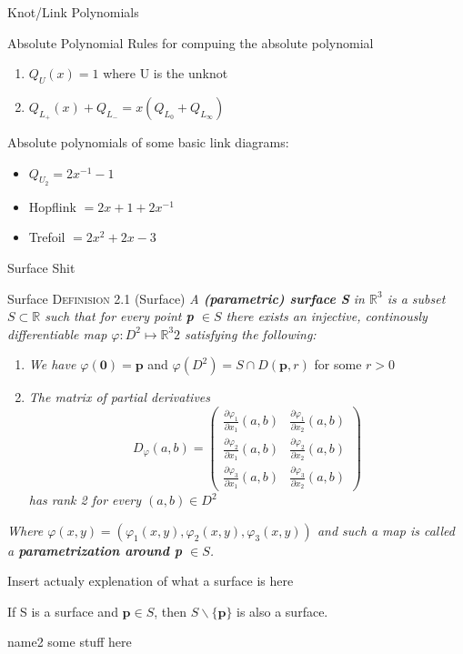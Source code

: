 \documentclass[12pt, letterpaper]{article}
\begin{document}
\begin{section}{Knot/Link Polynomials}
\begin{subsection}{Absolute Polynomial}
Rules for compuing the absolute polynomial
\begin{enumerate}
  \item \(Q_{U}(x) = 1\) where U is the unknot
  \item \(Q_{L_{+}}(x) + Q_{L_{-}} = x(Q_{L_{0}} + Q_{L_{\infty}})\)
\end{enumerate}

Absolute polynomials of some basic link diagrams:
\begin{itemize}
  \item \(Q_{U_{2}} = 2x^{-1} - 1\)
  \item Hopflink \(= 2x + 1 + 2x^{-1}\)
  \item Trefoil \(= 2x^{2} + 2x - 3\)
\end{itemize}
\end{subsection}

\end{section}

\begin{section}{Surface Shit}

  \begin{subsection}{Surface}
    \textsc{Definision 2.1} (Surface) \textit{A \textbf{(parametric) surface S} in \(\mathbb{R}^{3}\) is a subset \(S \subset \mathbb{R}\)
      such that for every point \textbf{p} \(\in S\) there exists an injective, continously differentiable map \(\varphi: D^{2} \mapsto \mathbb{R}^{3}2\)
      satisfying the following:}
    \begin{enumerate}
      \item \textit{We have \(\varphi(\textbf{0}) = \textbf{p}\)} and \(\varphi(D^{2}) = S \cap D(\textbf{p}, r)\) for some \(r > 0\)
      \item \textit{The matrix of partial derivatives}
            \textit{\[ D_{\varphi}(a, b) = \begin{pmatrix}
              \frac{\partial \varphi_{1}}{\partial x_{1}}(a, b) & \frac{\partial \varphi_{1}}{\partial x_{2}}(a, b) \\
              \frac{\partial \varphi_{2}}{\partial x_{1}}(a, b) & \frac{\partial \varphi_{2}}{\partial x_{2}}(a, b) \\
              \frac{\partial \varphi_{3}}{\partial x_{1}}(a, b) & \frac{\partial \varphi_{3}}{\partial x_{2}}(a, b)
            \end{pmatrix}\]}
            \textit{has rank 2 for every \((a, b) \in D^{2}\)}
    \end{enumerate}
    \textit{Where \(\varphi(x, y) = (\varphi_{1}(x, y), \varphi_{2}(x, y), \varphi_{3}(x, y))\) and such a map is called a
    \textbf{parametrization around p} \(\in S\).}

    Insert actualy explenation of what a surface is here

    If S is a surface and \(\textbf{p} \in S\), then \(S \backslash{} \{{} \textbf{p} \}{}\) is also a surface.
  \end{subsection}

  \begin{subsection}{name2}
    some stuff here
  \end{subsection}

\end{section}
\end{document}
